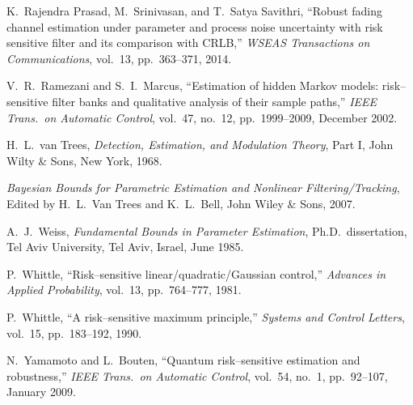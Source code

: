 \documentclass[11pt,epsf]{article}
\begin{document}
\begin{thebibliography}{AA}
K.~Rajendra Prasad, M.~Srinivasan, and T.~Satya Savithri, ``Robust fading
channel estimation under parameter and process noise uncertainty with risk
sensitive filter and its comparison with CRLB,'' {\it WSEAS Transactions on
Communications}, vol.\ 13, pp.\ 363--371, 2014.

V.~R.~Ramezani and S.~I.~Marcus, ``Estimation of hidden Markov models:
risk--sensitive filter banks and qualitative analysis of their sample paths,''
{\it IEEE Trans.\ on Automatic Control}, vol.\ 47, no.\ 12, pp.\ 1999--2009,
December 2002.

H.~L.~van Trees, {\it Detection, Estimation, and Modulation Theory},
Part I, John Wilty \& Sons, New York, 1968.

{\it Bayesian Bounds for Parametric Estimation
and Nonlinear Filtering/Tracking}, Edited by H.~L.~Van Trees and K.~L.~Bell,
John Wiley \& Sons, 2007.

A.~J.~Weiss, {\it Fundamental Bounds in Parameter Estimation},
Ph.D.\ dissertation, Tel Aviv University, Tel Aviv, Israel, June 1985.

P.~Whittle, ``Risk--sensitive linear/quadratic/Gaussian control,'' {\it
Advances in Applied Probability}, vol.\ 13, pp.\ 764--777, 1981.

P.~Whittle, ``A risk--sensitive maximum principle,'' {\it Systems and Control
Letters}, vol.\ 15, pp.\ 183--192, 1990.

N.~Yamamoto and L.~Bouten, ``Quantum risk--sensitive estimation and
robustness,'' {\it IEEE Trans.\ on Automatic Control}, vol.\ 54, no.\ 1, pp.\
92--107, January 2009.

\end{thebibliography}
\end{document}
